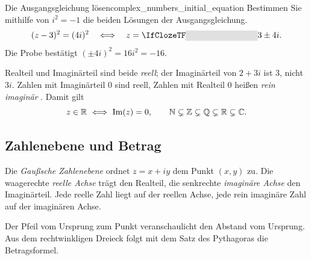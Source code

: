 \begin{ExampleBox}{Die Ausgangsgleichung lösen}{complex_numbers_initial_equation}
  Bestimmen Sie mithilfe von $i^2=-1$ die beiden Lösungen der Ausgangsgleichung.
  \[
    (z-3)^2=(4i)^2
      \quad\Longleftrightarrow\quad z=\Cloze{3cm}{3\pm4i}.
  \]
  Die Probe bestätigt $(\pm4i)^2=16i^2=-16$.
\end{ExampleBox}

\clearpage
\begin{RemarkBox}[remark title=Realteil und Imaginärteil sind reell]
  Realteil und Imaginärteil sind beide \emph{reell}; der Imaginärteil von
  $2+3i$ ist $3$, nicht $3i$.
  Zahlen mit Imaginärteil $0$ sind reell, Zahlen mit Realteil $0$ heißen
  \emph{rein imaginär} . Damit gilt
  \[
    z\in\R\ \Longleftrightarrow\ \operatorname{Im}(z)=0,
    \qquad \N\subsetneq\Z\subsetneq\Q\subsetneq\R\subsetneq\C.
  \]
\end{RemarkBox}

\subsection{Zahlenebene und Betrag}
Die \emph{Gaußsche Zahlenebene}  ordnet
$z=x+iy$ dem Punkt $(x,y)$ zu. Die waagerechte \emph{reelle Achse}
 trägt den Realteil, die senkrechte
\emph{imaginäre Achse}  den Imaginärteil.
Jede reelle Zahl liegt auf der reellen Achse, jede rein imaginäre Zahl
auf der imaginären Achse.
\begin{center}
\end{center}
Der Pfeil vom Ursprung zum Punkt veranschaulicht den Abstand vom Ursprung.
Aus dem rechtwinkligen Dreieck folgt mit dem Satz des Pythagoras die Betragsformel.

